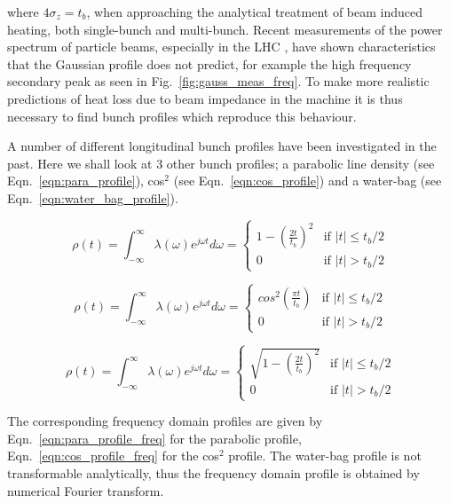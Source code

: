 \documentclass{cernyrep}
\begin{document}
where $4\sigma_{z} = t_{b}$, when approaching the analytical treatment of beam induced heating, both single-bunch and multi-bunch. Recent measurements of the power spectrum of particle beams, especially in the LHC \cite{Baudrenghien:LHCPowSpec}, have shown characteristics that the Gaussian profile does not predict, for example the high frequency secondary peak as seen in Fig.~\ref{fig:gauss_meas_freq}. To make more realistic predictions of heat loss due to beam impedance in the machine it is thus necessary to find bunch profiles which reproduce this behaviour.

A number of different longitudinal bunch profiles have been investigated in the past. Here we shall look at 3 other bunch profiles; a parabolic line density (see Eqn.~\ref{eqn:para_profile}), cos$^{2}$ (see Eqn.~\ref{eqn:cos_profile}) and a water-bag (see Eqn.~\ref{eqn:water_bag_profile}).

\begin{equation}
\rho\left( t \right) = \int^{\infty}_{-\infty} \lambda \left( \omega \right) e^{j\omega t} d\omega = 
\begin{cases}1-\left( \frac{2t} {t_{b}} \right)^{2} &\textrm{if $| t | \leq t_{b}/2$}\\
0								&\textrm{if $| t | > t_{b}/2$}
\end{cases}
\label{eqn:para_profile}
\end{equation}

\begin{equation}
\rho\left( t \right) = \int^{\infty}_{-\infty} \lambda \left( \omega \right) e^{j\omega t} d\omega = 
\begin{cases}
cos^{2}\left( \frac{\pi t} {t_{b}} \right) &\textrm{if $| t | \leq t_{b}/2$}\\
0								&\textrm{if $| t | > t_{b}/2$}
\end{cases}
\label{eqn:cos_profile}
\end{equation}

\begin{equation}
\rho\left( t \right) = \int^{\infty}_{-\infty} \lambda \left( \omega \right) e^{j\omega t} d\omega = 
\begin{cases}
\sqrt{1-\left( \frac{2t}{t_{b}}\right)^{2}} &\textrm{if $| t | \leq t_{b}/2$}\\
0								&\textrm{if $| t | > t_{b}/2$}
\end{cases}
\label{eqn:water_bag_profile}
\end{equation}

The corresponding frequency domain profiles are given by Eqn.~\ref{eqn:para_profile_freq} for the parabolic profile, Eqn.~\ref{eqn:cos_profile_freq} for the cos$^{2}$ profile. The water-bag profile is not transformable analytically, thus the frequency domain profile is obtained by numerical Fourier transform.
\end{document}
